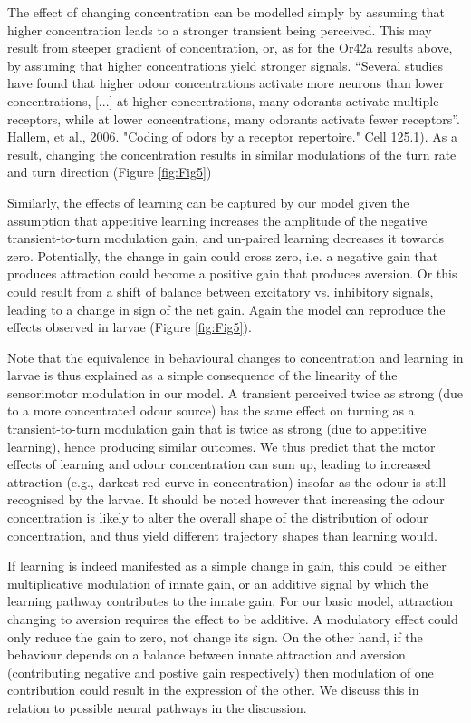 \documentclass[10pt,a4paper]{article}
\begin{document}
The effect of changing concentration can be modelled simply by assuming that higher concentration leads to a stronger transient being perceived. This may result from steeper gradient of concentration, or, as for the Or42a results above, by assuming that higher concentrations yield stronger signals.  “Several studies have found that higher odour concentrations activate more neurons than lower concentrations, [...] at higher concentrations, many odorants activate multiple receptors, while at lower concentrations, many odorants activate fewer receptors”. Hallem, et al., 2006. "Coding of odors by a receptor repertoire." Cell 125.1). As a result, changing the concentration results in similar modulations of the turn rate and turn direction (Figure \ref{fig:Fig5})

Similarly, the effects of learning can be captured by our model given the assumption that appetitive learning increases the amplitude of the negative transient-to-turn modulation gain, and un-paired learning decreases it towards zero. Potentially, the change in gain could cross zero, i.e. a negative gain that produces attraction could become a positive gain that produces aversion. Or this could result from a shift of balance between excitatory vs. inhibitory signals, leading to a change in sign of the net gain. Again the model can reproduce the effects observed in larvae (Figure \ref{fig:Fig5}). 

Note that the equivalence in behavioural changes to concentration and learning in larvae is thus explained as a simple consequence of the linearity of the sensorimotor modulation in our model. A transient perceived twice as strong (due to a more concentrated odour source) has the same effect on turning as a transient-to-turn modulation gain that is twice as strong (due to appetitive learning), hence producing similar outcomes. We thus predict that the motor effects of learning and odour concentration can sum up, leading to increased attraction (e.g., darkest red curve in concentration) insofar as the odour is still recognised by the larvae. It should be noted however that increasing the odour concentration is likely to alter the overall shape of the distribution of odour concentration, and thus yield different trajectory shapes than learning would.

If learning is indeed manifested as a simple change in gain, this could be either multiplicative modulation of innate gain, or an additive signal by which the learning pathway contributes to the innate gain. For our basic model, attraction changing to aversion requires the effect to be additive. A modulatory effect could only reduce the gain to zero, not change its sign. On the other hand, if the behaviour depends on a balance between innate attraction and aversion (contributing negative and postive gain respectively) then modulation of one contribution could result in the expression of the other. We discuss this in relation to possible neural pathways in the discussion.
\end{document}
